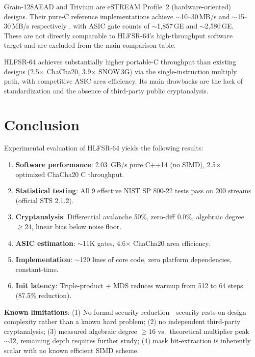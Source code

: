 \documentclass[11pt,a4paper]{article}
\begin{document}
{\footnotesize Grain-128AEAD and Trivium \cite{grain,trivium} are eSTREAM
Profile~2 (hardware-oriented) designs. Their pure-C reference implementations
achieve $\sim$10--30\,MB/s and $\sim$15--30\,MB/s respectively \cite{grain,trivium},
with ASIC gate counts of $\sim$1{,}857\,GE and $\sim$2{,}580\,GE. These are not
directly comparable to HLFSR-64's high-throughput software target and are
excluded from the main comparison table.}

HLFSR-64 achieves substantially higher portable-C throughput than
existing designs (2.5$\times$ ChaCha20, 3.9$\times$ SNOW\,3G) via the
single-instruction multiply path, with competitive ASIC area efficiency.
Its main drawbacks are the lack of standardization and the absence of
third-party public cryptanalysis.

\section{Conclusion}

Experimental evaluation of HLFSR-64 yields the following results:

\begin{enumerate}
\item \textbf{Software performance}: 2.03~GB/s pure C++14 (no SIMD), 2.5$\times$
  optimized ChaCha20 C throughput.
\item \textbf{Statistical testing}: All 9 effective NIST SP 800-22 tests pass
  on 200 streams (official STS 2.1.2).
\item \textbf{Cryptanalysis}: Differential avalanche 50\%, zero-diff 0.0\%,
  algebraic degree $\ge 24$, linear bias below noise floor.
\item \textbf{ASIC estimation}: $\sim$11K gates, 4.6$\times$ ChaCha20 area
  efficiency.
\item \textbf{Implementation}: $\sim$120 lines of core code, zero platform
  dependencies, constant-time.
\item \textbf{Init latency}: Triple-product + MDS reduces warmup from 512 to 64
  steps (87.5\% reduction).
\end{enumerate}

\textbf{Known limitations}: (1) No formal security reduction---security rests
on design complexity rather than a known hard problem; (2) no independent
third-party cryptanalysis; (3) measured algebraic degree $\ge 16$ vs.\
theoretical multiplier peak $\sim 32$, remaining depth requires further study;
(4) mask bit-extraction is inherently scalar with no known efficient SIMD
scheme.
\end{document}
